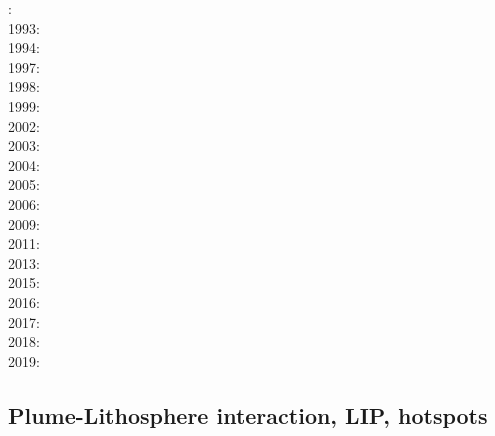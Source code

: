 {\scriptsize
{}: \cite{kell91}\\
1993: \cite{keki93}\\
1994: \cite{nasf94}\cite{fari94}\cite{leka94b}\cite{hayu94}\\
1997: \cite{vank97}\cite{keki97}\cite{laym97}\\
1998: \cite{thta98}\cite{stoc98}\\
1999: \cite{lays99}\\
2002: \cite{falt02}\cite{dagl02}\cite{nitg02}\cite{tagh02}\\
2003: \cite{safa03}\\
2004: \cite{goch04}\cite{scmo04}\\
2005: \cite{tagu05}\cite{bung05}\\
2006: \cite{isst06}\cite{liva06a}\cite{liva06b}\cite{zhon06}\cite{mita06}\cite{nokm06}\cite{qufo06}
      \cite{keso06}\\
2009: \cite{vavl09}\cite{bogj09}\cite{faho09}\cite{scbs09b}\\
2011: \cite{toyu11}\cite{talz11}\cite{burk11}\cite{memm11}\cite{dalt11}\cite{tree11}\\
2013: \cite{dagm13}\cite{madd13}\cite{ande13}\cite{vadv13}\\
2015: \cite{daso15}\cite{hafg15}\\
2016: \cite{kili16}\\
2017: \cite{zhli17}\cite{moyu17}\\
2018: \cite{dacc18}\cite{trev18}\\
2019: \cite{argc19}
}

\subsection{Plume-Lithosphere interaction, LIP, hotspots}


